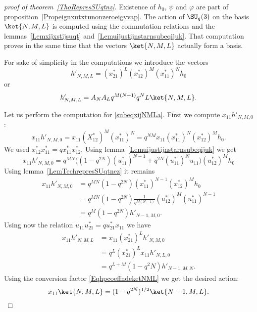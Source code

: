 \begin{proof}[proof of theorem~\ref{ThoRepresSUqtnz}]
	Existence of \( h_0\), \( \psi\) and \( \varphi\) are part of proposition~\ref{Propeignxutxtunonzeroeigvvap}. The action of \( \SU_q(3)\) on the basis \( \ket{N,M,L}\) is computed using the commutation relations and the lemmas~\ref{Lemxijxstijsuqt} and~\ref{Lemuijustijnstarnsubeqijuk}. That computation proves in the same time that the vectors \( \ket{N,M,L}\) actually form a basis.

	For sake of simplicity in the computations we introduce the vectors
	\begin{equation}
		h'_{N,M,L}=(x_{21}^*)^L(x_{12}^*)^M(x_{11}^*)^Nh_0
	\end{equation}
	or
	\begin{equation}        \label{EqhpcoeffndeketNML}
		h'_{N,M,L}=A_NA_Lq^{M(N+1)}q^NL\ket{N,M,L}.
	\end{equation}

	Let us perform the computation for \eqref{subeqxijNMLa}. First we compute \( x_{11}h'_{N,M,0}\):
	\begin{equation}
		x_{11}h'_{N,M,0}=x_{11}(X_{12}^*)^M(x_{11}^*)^N=q^{NM}x_{11}(x_{11}^*)^N(x_{12}^*)^Mh_0.
	\end{equation}
	We used \( x_{12}^*x_{11}^*=qx_{11}^*x_{12}^*\). Using lemma~\ref{Lemuijustijnstarnsubeqijuk} we get
	\begin{equation}
		x_{11}h'_{N,M,0}=q^{MN}\Big( (1-q^{2N})(u_{11}^*)^{N-1}+q^{2N}(u_{11}^*)^{N}u_{11} \Big)(u_{12}^*)^Mh_0
	\end{equation}
	Using lemma~\ref{LemTechrepresSUqtnez} it remains
	\begin{subequations}
		\begin{align}
			x_{11}h'_{N,M,0} & =q^{MN}(1-q^{2N})(x_{11}^*)^{N-1}(x_{12}^*)^Mh_0                    \\
			                 & =q^{MN}(1-q^{2N})\frac{1}{ q^{M(N-1)} }(u_{12}^*)^M(u_{11}^*)^{N-1} \\
			                 & =q^M(1-q^{2N})h'_{N-1,M,0}.
		\end{align}
	\end{subequations}
	Using now the relation \( u_{11}u_{21}^*=qu_{21}^*x_{11}\) we have
	\begin{subequations}
		\begin{align}
			x_{11}h'_{N,M,L} & =x_{11}(x_{21}^*)^Lh'_{N,M,0}    \\
			                 & =q^L(x_{21}^*)^Lx_{11}h'_{N,L,0} \\
			                 & =q^{L+M}(1-q^2N)h'_{N-1,M,N}.
		\end{align}
	\end{subequations}
	Using the conversion factor \eqref{EqhpcoeffndeketNML} we get the desired action:
	\begin{equation}
		x_{11}\ket{N,M,L}=(1-q^{2N})^{1/2}\ket{N-1,M,L}.
	\end{equation}


\end{proof}


